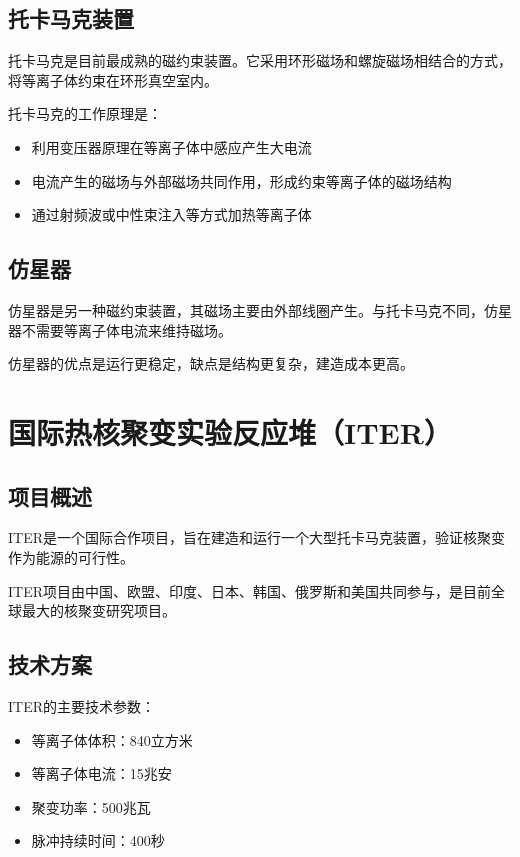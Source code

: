 \documentclass[12pt,UTF8]{ctexbook}
\begin{document}
\section{托卡马克装置}

托卡马克是目前最成熟的磁约束装置。它采用环形磁场和螺旋磁场相结合的方式，将等离子体约束在环形真空室内。

托卡马克的工作原理是：
\begin{itemize}[leftmargin=2cm]
    \item 利用变压器原理在等离子体中感应产生大电流
    \item 电流产生的磁场与外部磁场共同作用，形成约束等离子体的磁场结构
    \item 通过射频波或中性束注入等方式加热等离子体
\end{itemize}

\section{仿星器}

仿星器是另一种磁约束装置，其磁场主要由外部线圈产生。与托卡马克不同，仿星器不需要等离子体电流来维持磁场。

仿星器的优点是运行更稳定，缺点是结构更复杂，建造成本更高。

\chapter{国际热核聚变实验反应堆（ITER）}

\section{项目概述}

ITER是一个国际合作项目，旨在建造和运行一个大型托卡马克装置，验证核聚变作为能源的可行性。

ITER项目由中国、欧盟、印度、日本、韩国、俄罗斯和美国共同参与，是目前全球最大的核聚变研究项目。

\section{技术方案}

ITER的主要技术参数：
\begin{itemize}[leftmargin=2cm]
    \item 等离子体体积：840立方米
    \item 等离子体电流：15兆安
    \item 聚变功率：500兆瓦
    \item 脉冲持续时间：400秒
\end{itemize}
\end{document}
